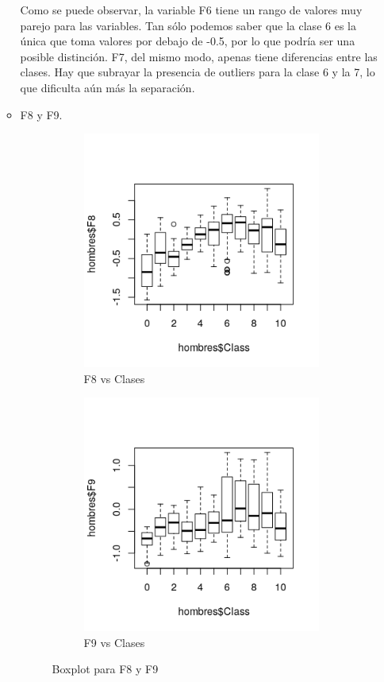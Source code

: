 \begin{itemize}
\begin{itemize}
	Como se puede observar, la variable F6 tiene un rango de valores muy parejo para las variables. Tan sólo podemos saber que la clase 6 es la única que toma valores por debajo de -0.5, por lo que podría ser una posible distinción. F7, del mismo modo, apenas tiene diferencias entre las clases. Hay que subrayar la presencia de outliers para la clase 6 y la 7, lo que dificulta aún más la separación.
	\newpage
	\item F8 y F9.
	
	\begin{figure}[H]
		\centering
		\begin{subfigure}{.5\textwidth}
			\centering
			\includegraphics[width=.8\linewidth]{bphF8.png}
			\caption{F8 vs Clases}
			\label{fig:bphF8}
		\end{subfigure}%
		\begin{subfigure}{.5\textwidth}
			\centering
			\includegraphics[width=.8\linewidth]{bphF9.png}
			\caption{F9 vs Clases}
			\label{fig:bphF9}
		\end{subfigure}
		\caption{Boxplot para F8 y F9}
		\label{fig:bph89}
	\end{figure}


\end{itemize}
\end{itemize}

